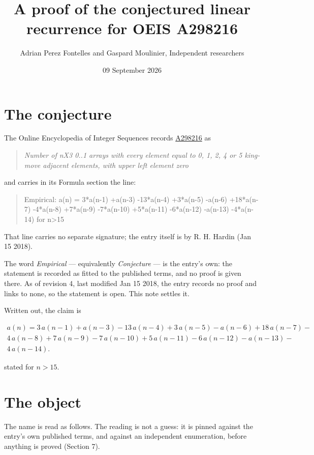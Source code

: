 \documentclass[11pt]{article}
\title{A proof of the conjectured linear recurrence for OEIS A298216}
\author{Adrian Perez Fontelles and Gaspard Moulinier, Independent researchers}
\date{09 September 2026}
\theoremstyle{definition}
\begin{document}
\maketitle
\section{The conjecture}

The Online Encyclopedia of Integer Sequences records \href{https://oeis.org/A298216}{A298216} as

\begin{quote}\itshape Number of nX3 0..1 arrays with every element equal to 0, 1, 2, 4 or 5 king-move adjacent elements, with upper left element zero\end{quote}

and carries in its Formula section the line:

\begin{quote}\ttfamily Empirical: a(n) = 3*a(n-1) +a(n-3) -13*a(n-4) +3*a(n-5) -a(n-6) +18*a(n-7) -4*a(n-8) +7*a(n-9) -7*a(n-10) +5*a(n-11) -6*a(n-12) -a(n-13) -4*a(n-14) for n>15\end{quote}

That line carries no separate signature; the entry itself is by R. H. Hardin (Jan 15 2018).

The word {\itshape Empirical} --- equivalently {\itshape Conjecture} --- is the entry's own: the statement is recorded as fitted to the published terms, and no proof is given there. As of revision 4, last modified Jan 15 2018, the entry records no proof and links to none, so the statement is open. This note settles it.

Written out, the claim is

\begin{multline*} a(n) = 3\,a(n-1) + a(n-3) - 13\,a(n-4) + 3\,a(n-5) - a(n-6) + 18\,a(n-7) - \\ 4\,a(n-8) + 7\,a(n-9) - 7\,a(n-10) + 5\,a(n-11) - 6\,a(n-12) - a(n-13) - \\ 4\,a(n-14). \end{multline*}

stated for $n > 15$.

\section{The object}

The name is read as follows. The reading is not a guess: it is pinned against the entry's own published terms, and against an independent enumeration, before anything is proved (Section 7).
\end{document}
